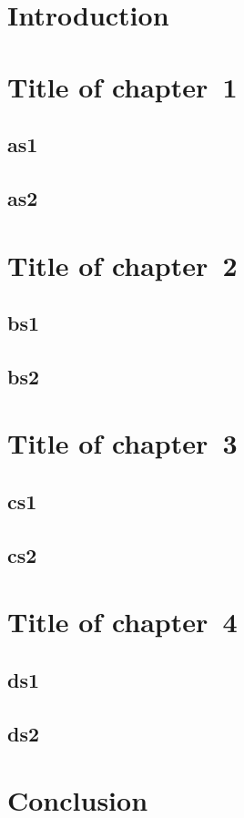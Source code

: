 \documentclass[a4paper]{report}
\begin{document}
\dominitoc
\tableofcontents
\chapter*{Introduction}
\mtcaddchapter[Introduction]
\chapter{Title of chapter~1}
\minitoc
\section{as1}
\section{as2}
\chapter{Title of chapter~2}
\minitoc
\section{bs1}
\section{bs2}
\chapter{Title of chapter~3}
\minitoc
\section{cs1}
\section{cs2}
\chapter{Title of chapter~4}
\minitoc
\section{ds1}
\section{ds2}
\chapter*{Conclusion}
\mtcaddchapter[Conclusion]
\end{document}
